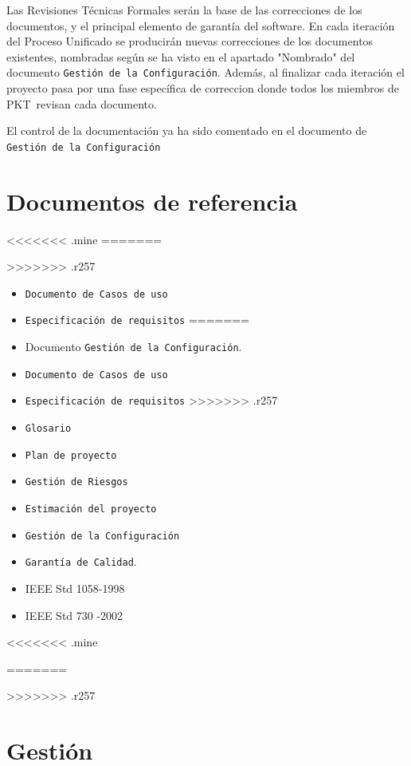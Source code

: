 \documentclass[spanish,a4paper,11pt, twoside]{report}	%
\newcommand*{\PKT}{\hbox{P}\kern-2.5pt\lower3.5pt\hbox{\small{K}}\kern-2.8pt\hbox{T}\kern-2pt}	%
\begin{document}
Las Revisiones Técnicas Formales serán la base de las correcciones de los documentos, y el principal elemento de garantía del software. En cada iteración del Proceso Unificado se producirán nuevas correcciones de los documentos existentes, nombradas según se ha visto en el apartado "Nombrado" del documento \texttt{Gestión de la Configuración}. Además, al finalizar cada iteración el proyecto pasa por una fase específica de correccion donde todos los miembros de  \PKT \ revisan cada documento.

El control de la documentación ya ha sido comentado en el documento de \texttt{Gestión de la Configuración}	

\chapter{ Documentos de referencia}
<<<<<<< .mine
=======
	
>>>>>>> .r257
\begin{itemize}
<<<<<<< .mine
	\item \texttt{Documento de Casos de uso}
	\item \texttt{Especificación de requisitos}
=======
	\item Documento \texttt{Gestión de la Configuración}.
	\item \texttt{Documento de Casos de uso}
	\item \texttt{Especificación de requisitos}
>>>>>>> .r257
	\item \texttt{Glosario}
	\item \texttt{Plan de proyecto}
	\item \texttt{Gestión de Riesgos}
	\item \texttt{Estimación del proyecto}
	\item \texttt{Gestión de la Configuración}
	\item \texttt{Garantía de Calidad}.
	\item IEEE Std 1058-1998
	\item IEEE Std 730 -2002

	
\end{itemize}	
<<<<<<< .mine

=======
	
>>>>>>> .r257
\newpage
\mbox{}
\thispagestyle{empty}						%
\newpage

\chapter{ Gestión}%
\end{document}
